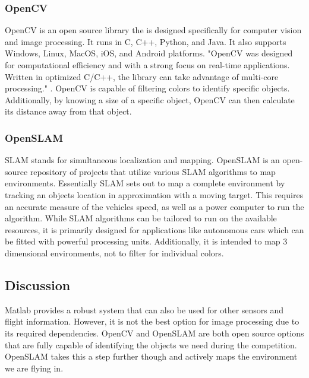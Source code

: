 \documentclass[letterpaper, 10, draftclsnofoot, onecolumn, compsoc]{IEEEtran}
\begin{document}
\subsubsection{OpenCV}

OpenCV is an open source library the is designed specifically for 
computer vision and image processing. It runs in C, C++, Python, 
and Java. It also supports Windows, Linux, MacOS, iOS, and Android 
platforms. "OpenCV was designed for computational efficiency and 
with a strong focus on real-time applications. Written in optimized 
C/C++, the library can take advantage of multi-core processing." \cite{r8}.
OpenCV is capable of filtering colors to identify specific objects. 
Additionally, by knowing a size of a specific object, OpenCV can 
then calculate its distance away from that object. 


\subsubsection{OpenSLAM}

SLAM stands for simultaneous localization and mapping. 
OpenSLAM\cite{r10} is an open-source repository of projects that 
utilize various SLAM algorithms to map environments. Essentially 
SLAM sets out to map a complete environment by tracking an objects 
location in approximation with a moving target. This requires an 
accurate measure of the vehicles speed, as well as a power computer 
to run the algorithm. While SLAM algorithms can be tailored to run 
on the available resources, it is primarily designed for 
applications like autonomous cars which can be fitted with powerful 
processing units. Additionally, it is intended to map 3 dimensional 
environments, not to filter for individual colors.


\subsection{Discussion}

Matlab provides a robust system that can also be used for other 
sensors and flight information. However, it is not the best option 
for image processing due to its required dependencies. OpenCV and 
OpenSLAM are both open source options that are fully capable of 
identifying the objects we need during the competition. OpenSLAM 
takes this a step further though and actively maps the environment 
we are flying in. 
\end{document}

